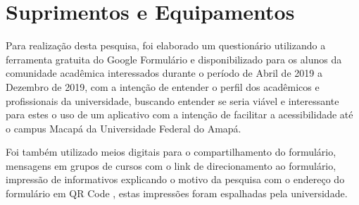 %
%

\chapter{Suprimentos e Equipamentos}\label{chap:suprimentos} 

Para realização desta pesquisa, foi elaborado um questionário utilizando a  ferramenta gratuita do Google Formulário e disponibilizado para os alunos da comunidade acadêmica interessados durante o período de Abril de 2019 a Dezembro de 2019, com a intenção de entender o perfil dos acadêmicos e profissionais  da universidade, buscando entender se seria  viável e interessante para estes o uso de um aplicativo com a intenção de facilitar a acessibilidade até o campus Macapá da Universidade Federal do Amapá.

Foi também utilizado meios digitais para o compartilhamento do formulário, mensagens em grupos de cursos com o link de direcionamento ao formulário, impressão de informativos explicando o motivo da pesquisa com o endereço do formulário em QR Code , estas impressões foram espalhadas pela universidade. 
